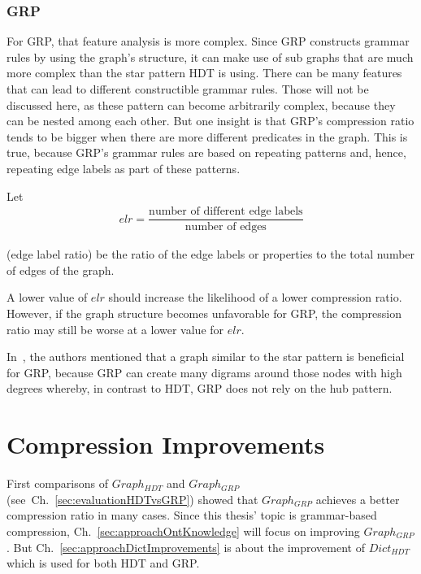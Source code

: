 \subsubsection{GRP}
For GRP, that feature analysis is more complex. Since GRP constructs grammar rules by using the graph's structure, it can make use of sub graphs that are much more complex than the star pattern HDT is using. There can be many features that can lead to different constructible grammar rules. Those will not be discussed here, as these pattern can become arbitrarily complex, because they can be nested among each other. But one insight is that GRP's compression ratio tends to be bigger when there are more different predicates in the graph. This is true, because GRP's grammar rules are based on repeating patterns and, hence, repeating edge labels as part of these patterns.

Let 
\begin{align*}
elr = \dfrac{\text{number of different edge labels}}{\text{number of edges}} 
\end{align*}

(edge label ratio) be the ratio of the edge labels or properties to the total number of edges of the graph. 

A lower value of $elr$ should increase the likelihood of a lower compression ratio.  However, if the graph structure becomes unfavorable for GRP, the compression ratio may still be worse at a lower value for $elr$.

In~\cite{maneth}, the authors mentioned that a graph similar to the star pattern is beneficial for GRP, because GRP can create many digrams around those nodes with high degrees whereby, in contrast to HDT, GRP does not rely on the hub pattern.


\section{Compression Improvements}\label{sec:approachComprRatioImprovements}

First comparisons of $Graph_{HDT}$ and $Graph_{GRP}$ (see~Ch.~\ref{sec:evaluationHDTvsGRP}) showed that  $Graph_{GRP}$ achieves a better compression ratio in many cases. Since this thesis' topic is grammar-based compression, Ch.~\ref{sec:approachOntKnowledge} will focus on improving $Graph_{GRP}$. But Ch.~\ref{sec:approachDictImprovements} is about the improvement of $Dict_{HDT}$ which is used for both HDT and GRP.



